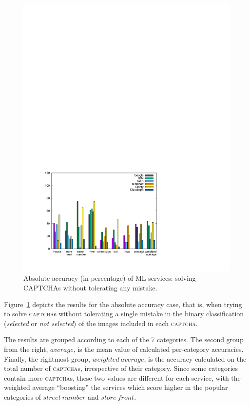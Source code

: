 \documentclass[sigconf,review,anonymous]{acmart}
\newcommand{\captcha}{\textsc{captcha}\xspace}
\newcommand{\captchas}{\textsc{captcha}s\xspace}
\begin{document}
\begin{figure}[t]
\centering
\includegraphics[width=\columnwidth]{images/accuracies-1.pdf}
\caption{Absolute accuracy (in percentage) of ML services: solving CAPTCHAs without tolerating any mistake.}
\label{res-accuracies}
\end{figure}

Figure~\ref{res-accuracies} depicts the results for the absolute accuracy case, that is, when trying to solve \captchas without tolerating a single mistake in the binary classification (\textit{selected} or \textit{not selected}) of the images included in each \captcha.

The results are grouped according to each of the 7 categories.
The second group from the right, $average$, is the mean value of calculated per-category accuracies. 
Finally, the rightmost group, $weighted~average$, is the accuracy calculated on the total number of \captchas, irrespective of their category. Since some categories contain more \captchas, these two values are different for each service, with the weighted average ``boosting'' the services which score higher in the popular categories of $street~number$ and $store~front$.
\end{document}
